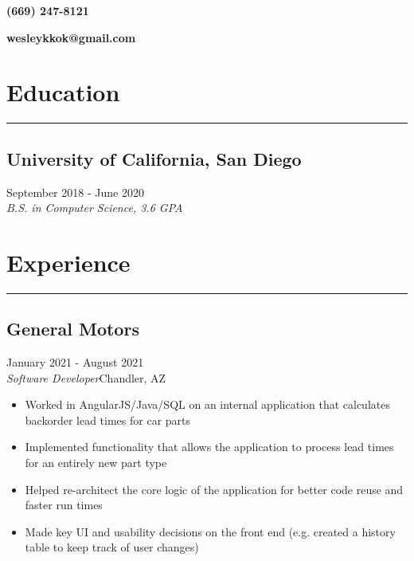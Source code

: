 \documentclass{article}
\makeatletter
\renewcommand{\maketitle}
{
\vspace{-1em}
{\hfill\large\bf (669) 247-8121}

\vspace{-2em}
{\noindent\fontsize{40pt}{0pt}\selectfont\bf\color{DarkMidnightBlue} \theauthor} 

\vspace{-1.5em}
{\hfill\large\bf wesleykkok@gmail.com}

}
\makeatother
\begin{document}
\author{Wesley Kok}
\maketitle 					%
\thispagestyle{empty} 		%
\large 						%
\setlength\parindent{0pt}	%

\vspace{-0.5em}
\section{Education}
\vspace{-1.5em}
\par\noindent\rule{\textwidth}{0.4pt}

\vspace{-0.5em}
\subsection{University of California, San Diego}\hfill {\color{NavyBlue}September 2018 - June 2020\\ 
{\color{Black}\it B.S. in Computer Science, 3.6 GPA}}

\vspace{-0.5em}
\section{Experience}
\vspace{-1.5em}
\par\noindent\rule{\textwidth}{0.4pt}

\vspace{-0.5em}
\subsection{General Motors}\hfill {\color{NavyBlue}January 2021 - August 2021\\ {\color{Black}\it Software Developer}\hfill Chandler, AZ}%
\begin{itemize}
\itemsep0em 
	\item Worked in AngularJS/Java/SQL on an internal application that calculates backorder lead times for car parts
	\item Implemented functionality that allows the application to process lead times for an entirely new part type
	\item Helped re-architect the core logic of the application for better code reuse and faster run times
	\item Made key UI and usability decisions on the front end (e.g. created a history table to keep track of user changes)
\end{itemize}
\end{document}
